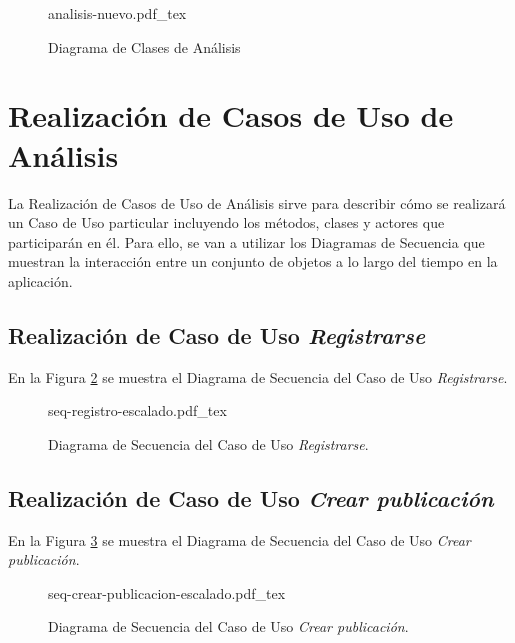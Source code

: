 \begin{figure}
    \centering
    \begin{normalsize}
        {analisis-nuevo.pdf_tex}
    \end{normalsize}
    \caption{Diagrama de Clases de Análisis}
     \label{fig:diagrama-clases-analisis}
 
 \end{figure}


\section{Realización de Casos de Uso de Análisis}
La Realización de Casos de Uso de Análisis sirve para describir cómo se realizará un Caso de Uso particular incluyendo los métodos, clases y actores que participarán en él. Para ello, se van a utilizar los Diagramas de Secuencia \cite{diagrama-secuencia} que muestran la interacción entre un conjunto de objetos a lo largo del tiempo en la aplicación. 

\subsection{Realización de Caso de Uso \textit{Registrarse}}
En la Figura \ref{fig:secuencia-registro}  se muestra el Diagrama de Secuencia del Caso de Uso \textit{Registrarse}.


\begin{figure}
    \centering
    \begin{normalsize}
        {seq-registro-escalado.pdf_tex}
    \end{normalsize}
    \caption{Diagrama de Secuencia del Caso de Uso \textit{Registrarse}.}
     \label{fig:secuencia-registro}
 
 \end{figure}



\subsection{Realización de Caso de Uso \textit{Crear publicación}}
En la Figura \ref{fig:secuencia-crear-publicacion}  se muestra el Diagrama de Secuencia del Caso de Uso \textit{Crear publicación}.


\begin{figure}
    \centering
    \begin{normalsize}
        {seq-crear-publicacion-escalado.pdf_tex}
    \end{normalsize}
    \caption{Diagrama de Secuencia del Caso de Uso \textit{Crear publicación}.}
     \label{fig:secuencia-crear-publicacion}
 
 \end{figure}




